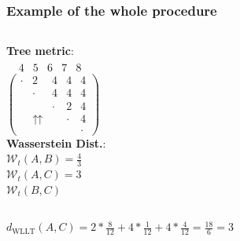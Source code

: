 \addtocounter{framenumber}{-1}
\begin{frame}
\frametitle{Example of the whole procedure}
\begin{columns}[T]%
	\textbf{Tree metric}:\\
	$\begin{array}{ccccc}
	\ \ \; \textit{4} & \textit{5} & \textit{6} & \textit{7} & \textit{8}
	\end{array}$\\
	$
	\left(		
	\begin{array}{ccccc}
	\cdot & 2 & 4 & 4 & 4 \\
	& \cdot & 4 & 4 & 4 \\
	&   & \cdot & 2 & 4 \\
	& \upuparrows & & \cdot & 4\\
	&   &   &   & \cdot
	\end{array}
	\right)
	$\\
	\textbf{Wasserstein Dist.}:\\
	$\mathcal{W}_{t}(A,B) = \frac{4}{3}$\\
	$\mathcal{W}_{t}(A,C) = 3$\\
	$\mathcal{W}_{t}(B,C)$\\
\end{columns}
\vspace{0.5cm}
$d_{\text{WLLT}}(A,C) = 2*\frac{8}{12} + 4*\frac{1}{12} + 4*\frac{4}{12} = \frac{18}{6} = 3$
\end{frame}

